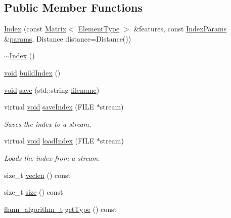 \subsection*{Public Member Functions}
\begin{DoxyCompactItemize}
\item 
\hyperlink{classcvflann_1_1Index_a11d668c0e1640b5093f73c9f7d6a1e4e}{Index} (const \hyperlink{classcvflann_1_1Matrix}{Matrix}$<$ \hyperlink{classcvflann_1_1Index_a9fbfc2c13b3226997cfc15fc3a55b7c5}{Element\-Type} $>$ \&features, const \hyperlink{namespacecvflann_a742b4c7076c21012054af74a9ee48289}{Index\-Params} \&\hyperlink{compat_8hpp_a0480a03ecc41b20cde376602531d9270}{params}, Distance distance=Distance())
\item 
\hyperlink{classcvflann_1_1Index_a2475b3513ae6b2ccff64f2fc8dfda6e6}{$\sim$\-Index} ()
\item 
\hyperlink{legacy_8hpp_a8bb47f092d473522721002c86c13b94e}{void} \hyperlink{classcvflann_1_1Index_ad9492a05669ee5bc1b07a4e2d0ac13c6}{build\-Index} ()
\item 
\hyperlink{legacy_8hpp_a8bb47f092d473522721002c86c13b94e}{void} \hyperlink{classcvflann_1_1Index_a65a17a1a9b2a705e16e8e85947b5a24d}{save} (std\-::string \hyperlink{core__c_8h_acc427f35f3bd9f865d39012657cc42f8}{filename})
\item 
virtual \hyperlink{legacy_8hpp_a8bb47f092d473522721002c86c13b94e}{void} \hyperlink{classcvflann_1_1Index_a7cad2783e47031b8e1ea0c1a56eb72cc}{save\-Index} (F\-I\-L\-E $\ast$stream)
\begin{DoxyCompactList}\small\item\em Saves the index to a stream. \end{DoxyCompactList}\item 
virtual \hyperlink{legacy_8hpp_a8bb47f092d473522721002c86c13b94e}{void} \hyperlink{classcvflann_1_1Index_ae0c80ab480e30654dbded8eebc25952e}{load\-Index} (F\-I\-L\-E $\ast$stream)
\begin{DoxyCompactList}\small\item\em Loads the index from a stream. \end{DoxyCompactList}\item 
size\-\_\-t \hyperlink{classcvflann_1_1Index_a6b7474356bf2d43469d54eb98aabd5d8}{veclen} () const 
\item 
size\-\_\-t \hyperlink{classcvflann_1_1Index_a34ac9de2d07ec799f294496a05d9a97d}{size} () const 
\item 
\hyperlink{namespacecvflann_a4e3e6c98d774ea77fd7f0045c9bc7817}{flann\-\_\-algorithm\-\_\-t} \hyperlink{classcvflann_1_1Index_ac1c9455f7c67a9f4d0dc70f301a4e617}{get\-Type} () const 

\end{DoxyCompactItemize}

